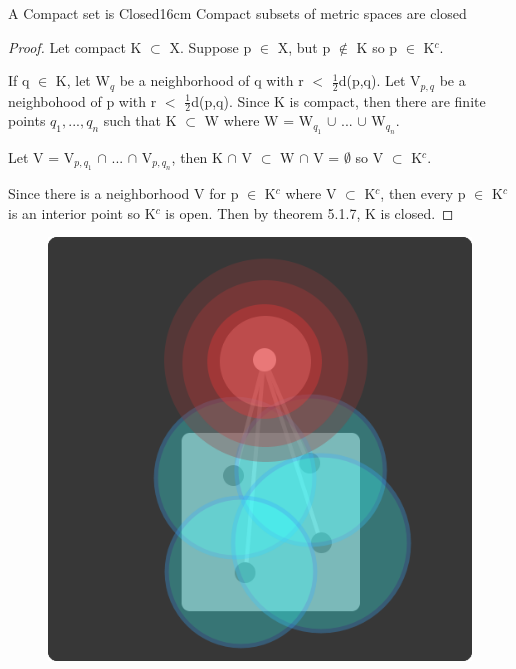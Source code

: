 	\newpage



	\begin{wtheorem}{A Compact set is Closed}{16cm}
		Compact subsets of metric spaces are closed
	\end{wtheorem}
	
	\begin{proof}
		Let compact K $\subset$ X.
		Suppose p $\in$ X, but p $\not \in$ K so p $\in$ K$^c$.

		If q $\in$ K, let W$_q$ be a neighborhood of q with
		r $<$ $\frac{1}{2}$d(p,q).
		Let V$_{p,q}$ be a neighbohood of p with r $<$ $\frac{1}{2}$d(p,q).
		Since K is compact, then there are finite points $q_1, ... , q_n$
		such that K $\subset$ W where W = W$_{q_1}$ $\cup$ ... $\cup$ W$_{q_n}$.

		Let V = V$_{p,q_1}$ $\cap$ ... $\cap$ V$_{p,q_n}$, then
		K $\cap$ V $\subset$ W $\cap$ V = $\emptyset$ so V $\subset$ K$^c$.

		Since there is a neighborhood V for p $\in$ K$^c$ where V $\subset$ K$^c$,
		then every p $\in$ K$^c$ is an interior point so K$^c$ is open.
		Then by {\color{red} theorem 5.1.7}, K is closed.	
	\end{proof}



	\begin{figure}[h]
		\centering
		\includegraphics[scale=0.35]{Images/6.3.4.png}
	\end{figure}



